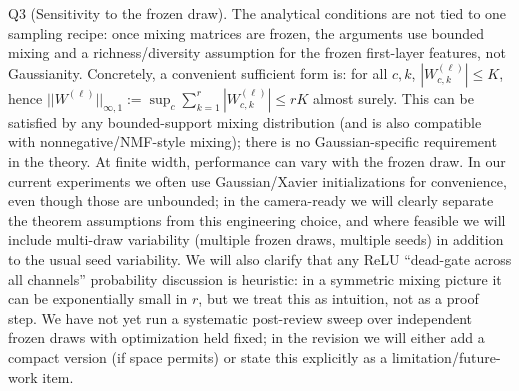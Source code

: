 Q3 (Sensitivity to the frozen draw). The analytical conditions are not tied to one sampling recipe: once mixing matrices are frozen, the arguments use bounded mixing and a richness/diversity assumption for the frozen first-layer features, not Gaussianity. Concretely, a convenient sufficient form is: for all $c,k$, $|W^{(\ell)}_{c,k}|\le K$, hence $||W^{(\ell)}||_{\infty,1}:=\sup_c\sum_{k=1}^r |W^{(\ell)}_{c,k}|\le rK$ almost surely. This can be satisfied by any bounded-support mixing distribution (and is also compatible with nonnegative/NMF-style mixing); there is no Gaussian-specific requirement in the theory.
At finite width, performance can vary with the frozen draw. In our current experiments we often use Gaussian/Xavier initializations for convenience, even though those are unbounded; in the camera-ready we will clearly separate the theorem assumptions from this engineering choice, and where feasible we will include multi-draw variability (multiple frozen draws, multiple seeds) in addition to the usual seed variability. We will also clarify that any ReLU “dead-gate across all channels” probability discussion is heuristic: in a symmetric mixing picture it can be exponentially small in $r$, but we treat this as intuition, not as a proof step.
We have not yet run a systematic post-review sweep over independent frozen draws with optimization held fixed; in the revision we will either add a compact version (if space permits) or state this explicitly as a limitation/future-work item.

